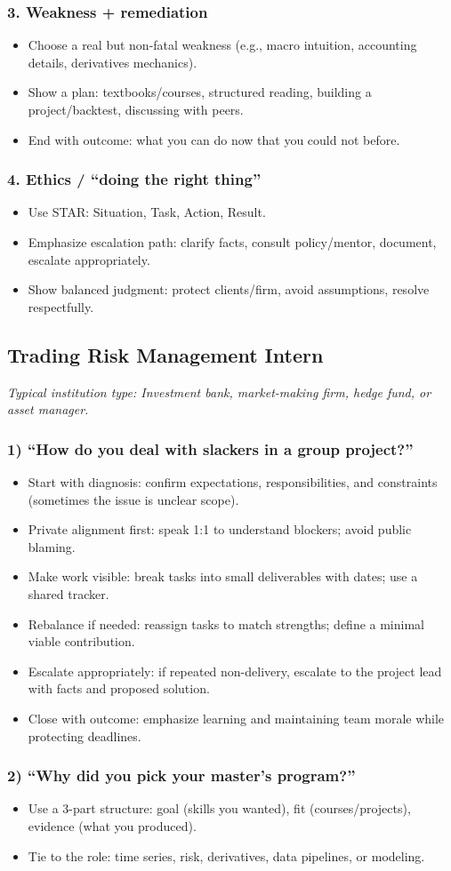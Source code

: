 \documentclass[11pt,letterpaper,openany]{book}
\newcommand{\RoleProfile}[2]{%
  \subsection{#1}%
  \noindent\textit{Typical institution type: #2.}\par
}
\newcommand{\prompt}[1]{\subsubsection*{#1}}
\begin{document}
\prompt{3. Weakness + remediation}
\begin{itemize}
  \item Choose a real but non-fatal weakness (e.g., macro intuition, accounting details, derivatives mechanics).
  \item Show a plan: textbooks/courses, structured reading, building a project/backtest, discussing with peers.
  \item End with outcome: what you can do now that you could not before.
\end{itemize}

\prompt{4. Ethics / ``doing the right thing''}
\begin{itemize}
  \item Use STAR: Situation, Task, Action, Result.
  \item Emphasize escalation path: clarify facts, consult policy/mentor, document, escalate appropriately.
  \item Show balanced judgment: protect clients/firm, avoid assumptions, resolve respectfully.
\end{itemize}

\RoleProfile{Trading Risk Management Intern}{Investment bank, market-making firm, hedge fund, or asset manager}

\prompt{1) ``How do you deal with slackers in a group project?''}
\begin{itemize}
  \item Start with diagnosis: confirm expectations, responsibilities, and constraints (sometimes the issue is unclear scope).
  \item Private alignment first: speak 1:1 to understand blockers; avoid public blaming.
  \item Make work visible: break tasks into small deliverables with dates; use a shared tracker.
  \item Rebalance if needed: reassign tasks to match strengths; define a minimal viable contribution.
  \item Escalate appropriately: if repeated non-delivery, escalate to the project lead with facts and proposed solution.
  \item Close with outcome: emphasize learning and maintaining team morale while protecting deadlines.
\end{itemize}

\prompt{2) ``Why did you pick your master's program?''}
\begin{itemize}
  \item Use a 3-part structure: goal (skills you wanted), fit (courses/projects), evidence (what you produced).
  \item Tie to the role: time series, risk, derivatives, data pipelines, or modeling.
\end{itemize}
\end{document}
